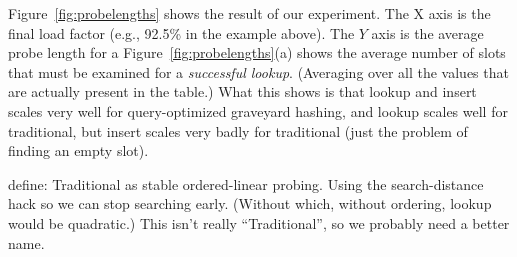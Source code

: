 \documentclass[10pt]{article}
\theoremstyle{remark}
\theoremstyle{remark}
\newcommand{\figref}[1]{Figure~\ref{fig:#1}}
\begin{document}
\figref{probelengths} shows the result of our experiment.
The X axis is the final load factor (e.g., 92.5\% in the example above).  The $Y$ axis is the average probe length for a 
\figref{probelengths}(a) shows the average number of slots that must be
examined for a \textit{successful lookup}.  (Averaging over all the
values that are actually present in the table.)  What this shows is that lookup and insert scales very well for query-optimized graveyard hashing, and lookup scales well for traditional, but insert scales very badly for traditional (just the problem of finding an empty slot).

define: Traditional as stable ordered-linear probing.  Using the
search-distance hack so we can stop searching early.  (Without which,
without ordering, lookup would be quadratic.)  This isn't really
``Traditional'', so we probably need a better name.
\end{document}
